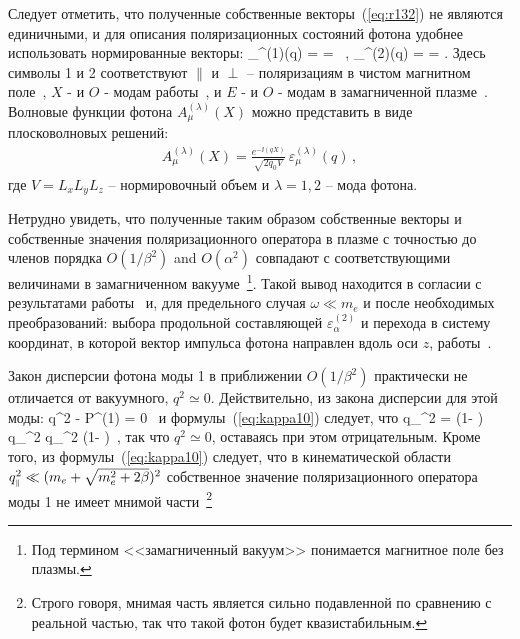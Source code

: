 Следует отметить, что полученные собственные векторы~(\ref{eq:r132}) не являются единичными, и для описания поляризационных состояний фотона удобнее использовать нормированные векторы:
%
\beq
\label{eq:epsilon}
\varepsilon_\alpha^{(1)}(q) =  = 
 \, , \quad
\varepsilon_\alpha^{(2)}(q) =  = 
.
\eeq
\noindent Здесь символы 1 и 2 соответствуют  $\|$ и $\perp$ --  поляризациям в чистом магнитном поле~\cite{Adler:1971}, $X$ - и $O$ -  модам работы~\cite{Mushtukov:2016}, и $E$ - и $O$ -  модам в замагниченной плазме~\cite{Thompson:1996}. Волновые функции фотона $A^{(\lambda)}_\mu(X)$ можно представить в виде плосковолновых решений:
%
\begin{eqnarray}
	\label{eq:j_k}
	A^{(\lambda)}_\mu (X) = \frac{e^{-\ii(qX)}}{\sqrt{2q_0 V}} \, \varepsilon^{(\lambda)}_\mu(q) \, ,
\end{eqnarray}
\noindent где  $V = L_x L_y L_z$ -- нормировочный объем и $\lambda = 1, 2$ -- мода фотона.

Нетрудно увидеть, что полученные таким образом собственные векторы и собственные значения поляризационного 
оператора в плазме с точностью до членов порядка  $O(1/\beta^2)$ and $O(\alpha^2)$ совпадают с соответствующими величинами в  замагниченном вакууме~\footnote{Под термином <<замагниченный вакуум>>  понимается магнитное поле без плазмы.}. Такой вывод находится в согласии с результатами работы~\cite{Shabad:1988} и, для предельного случая $\omega \ll m_e$ и после необходимых преобразований: выбора продольной составляющей $\varepsilon^{(2)}_\alpha$ и перехода в систему координат, в которой вектор импульса фотона направлен вдоль оси $z$, работы~\cite{Potekhin:2004}.

Закон дисперсии фотона моды 1 в приближении $O(1/\beta^2)$ практически не отличается от вакуумного, $q^2 \simeq 0$. Действительно, из закона дисперсии для этой моды:
%
\beq
q^2 - {\cal P}^{(1)} = 0 \, 
\label{disper1}
\eeq
\noindent и формулы~(\ref{eq:kappa10}) следует, что
%
\beq
q_{\mprl}^2 = \left (1- \frac{\alpha}{3\pi}  \right) \, q_{\mprp}^2  
\simeq q_{\mprp}^2 \left (1- \frac{\alpha}{3\pi} \right)\, , 
\label{disper12}
\eeq
\noindent так что $q^2 \simeq 0$, оставаясь при этом отрицательным. Кроме того, из формулы~(\ref{eq:kappa10}) следует, что в кинематической области $q^2_{\mbox{\tiny $\|$}} \ll (m_e+\sqrt{m_e^2+2 \beta})^2$ собственное значение поляризационного оператора моды 1 не имеет мнимой части~\footnote{Строго говоря, мнимая часть является сильно подавленной по сравнению с реальной частью, так что такой фотон будет квазистабильным.}

